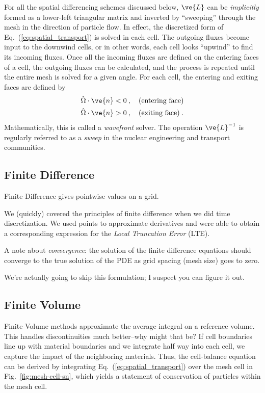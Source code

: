 \documentclass[12pt]{article}
\newcommand{\vOmega}{\ensuremath{\hat{\Omega}}}
\begin{document}
For all
the spatial differencing schemes discussed below, $\ve{L}$ can be \textit{implicitly}
formed as a lower-left triangular matrix and inverted by ``sweeping'' through
the mesh in the direction of particle flow.  In effect, the discretized form
of Eq.~(\ref{eq:spatial_transport}) is solved in each cell.  The outgoing
fluxes become input to the downwind cells, or in other words, each cell looks
``upwind'' to find its incoming fluxes.  Once all the incoming fluxes are
defined on the entering faces of a cell, the outgoing fluxes can be
calculated, and the process is repeated until the entire mesh is solved for a
given angle.  For each cell, the entering and exiting faces are defined by
\begin{align}
  \vOmega\cdot\ve{n} &< 0\:,\quad (\text{entering
    face})\label{eq:entering-face}\\ \vOmega\cdot\ve{n} &> 0\:,\quad
  (\text{exiting face})\label{eq:exiting-face}\:.
\end{align}
Mathematically, this is called a \textit{wavefront} solver.  The operation
$\ve{L}^{-1}$ is regularly referred to as a \textit{sweep} in the nuclear
engineering and transport communities.  


\subsection*{Finite Difference}
Finite Difference gives pointwise values on a grid.

We (quickly) covered the principles of finite difference when we did time discretization. We used points to approximate derivatives and were able to obtain a corresponding expression for the \textit{Local Truncation Error} (LTE).

A note about \textit{convergence}: the solution of the finite difference equations should converge to the true solution of the PDE as grid spacing (mesh size) goes to zero.	

We're actually going to skip this formulation; I suspect you can figure it out.

\subsection*{Finite Volume}
Finite Volume methods approximate the average integral on a reference volume. This handles discontinuities much better--why might that be? If cell boundaries line up with material boundaries and we integrate half way into each cell, we capture the impact of the neighboring materials. Thus, the cell-balance equation can be derived by integrating Eq.~(\ref{eq:spatial_transport}) over the mesh cell in
Fig.~\ref{fig:mesh-cell-sn}, which yields
a statement of conservation of particles within the mesh cell. 
\end{document}
